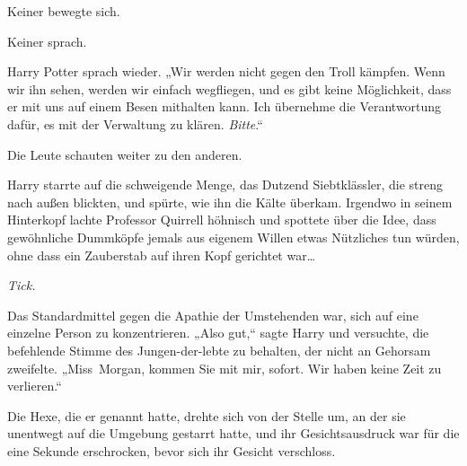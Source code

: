 Keiner bewegte sich.

Keiner sprach.

Harry Potter sprach wieder. „Wir werden nicht gegen den Troll kämpfen. Wenn wir ihn sehen, werden wir einfach wegfliegen, und es gibt keine Möglichkeit, dass er mit uns auf einem Besen mithalten kann. Ich übernehme die Verantwortung dafür, es mit der Verwaltung zu klären. \emph{Bitte}.“

Die Leute schauten weiter zu den anderen.

\later

Harry starrte auf die schweigende Menge, das Dutzend Siebtklässler, die streng nach außen blickten, und spürte, wie ihn die Kälte überkam. Irgendwo in seinem Hinterkopf lachte Professor Quirrell höhnisch und spottete über die Idee, dass gewöhnliche Dummköpfe jemals aus eigenem Willen etwas Nützliches tun würden, ohne dass ein Zauberstab auf ihren Kopf gerichtet war…

\emph{Tick.}

Das Standardmittel gegen die Apathie der Umstehenden war, sich auf eine einzelne Person zu konzentrieren.
„Also gut,“ sagte Harry und versuchte, die befehlende Stimme des Jungen-der-lebte zu behalten, der nicht an Gehorsam zweifelte. „Miss~Morgan, kommen Sie mit mir, sofort. Wir haben keine Zeit zu verlieren.“

Die Hexe, die er genannt hatte, drehte sich von der Stelle um, an der sie unentwegt auf die Umgebung gestarrt hatte, und ihr Gesichtsausdruck war für die eine Sekunde erschrocken, bevor sich ihr Gesicht verschloss.

